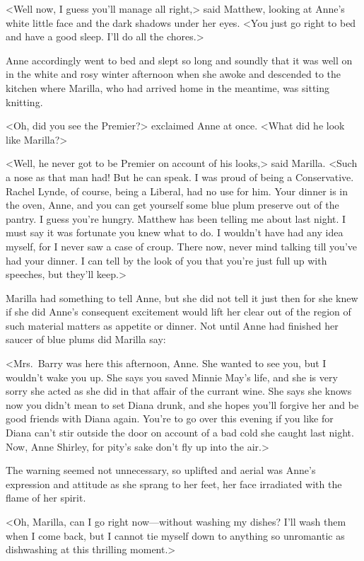 <Well now, I guess you'll manage all right,> said Matthew, looking at Anne's white little face and the dark shadows under her eyes. <You just go right to bed and have a good sleep. I'll do all the chores.>

Anne accordingly went to bed and slept so long and soundly that it was well on in the white and rosy winter afternoon when she awoke and descended to the kitchen where Marilla, who had arrived home in the meantime, was sitting knitting.

<Oh, did you see the Premier?> exclaimed Anne at once. <What did he look like Marilla?>

<Well, he never got to be Premier on account of his looks,> said Marilla. <Such a nose as that man had! But he can speak. I was proud of being a Conservative. Rachel Lynde, of course, being a Liberal, had no use for him. Your dinner is in the oven, Anne, and you can get yourself some blue plum preserve out of the pantry. I guess you're hungry. Matthew has been telling me about last night. I must say it was fortunate you knew what to do. I wouldn't have had any idea myself, for I never saw a case of croup. There now, never mind talking till you've had your dinner. I can tell by the look of you that you're just full up with speeches, but they'll keep.>

Marilla had something to tell Anne, but she did not tell it just then for she knew if she did Anne's consequent excitement would lift her clear out of the region of such material matters as appetite or dinner. Not until Anne had finished her saucer of blue plums did Marilla say:

<Mrs.~Barry was here this afternoon, Anne. She wanted to see you, but I wouldn't wake you up. She says you saved Minnie May's life, and she is very sorry she acted as she did in that affair of the currant wine. She says she knows now you didn't mean to set Diana drunk, and she hopes you'll forgive her and be good friends with Diana again. You're to go over this evening if you like for Diana can't stir outside the door on account of a bad cold she caught last night. Now, Anne Shirley, for pity's sake don't fly up into the air.>

The warning seemed not unnecessary, so uplifted and aerial was Anne's expression and attitude as she sprang to her feet, her face irradiated with the flame of her spirit.

<Oh, Marilla, can I go right now—without washing my dishes? I'll wash them when I come back, but I cannot tie myself down to anything so unromantic as dishwashing at this thrilling moment.>

